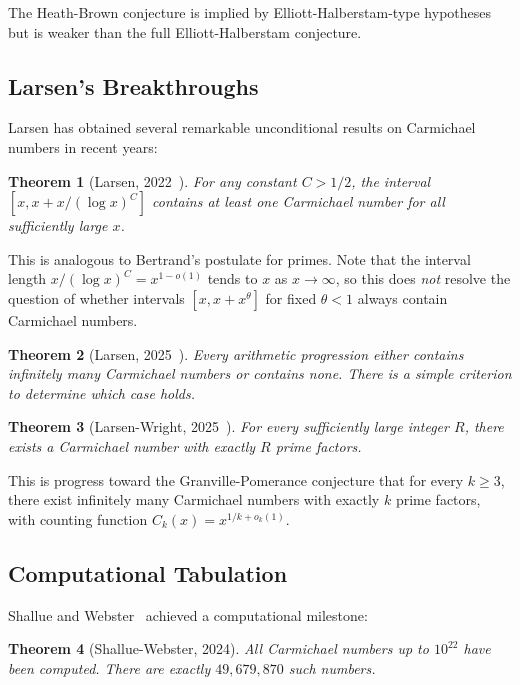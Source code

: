 \documentclass{amsart}
\theoremstyle{plain}
\newtheorem{theorem}{Theorem}[section]
\theoremstyle{definition}
\theoremstyle{remark}
\begin{document}
The Heath-Brown conjecture is implied by Elliott-Halberstam-type hypotheses but is weaker than the full Elliott-Halberstam conjecture.

\subsection{Larsen's Breakthroughs}

Larsen has obtained several remarkable unconditional results on Carmichael numbers in recent years:

\begin{theorem}[Larsen, 2022~\cite{larsen2023}]
\label{thm:larsen-short}
For any constant $C > 1/2$, the interval $[x, x + x/(\log x)^C]$ contains at least one Carmichael number for all sufficiently large $x$.
\end{theorem}

This is analogous to Bertrand's postulate for primes. Note that the interval length $x/(\log x)^C = x^{1 - o(1)}$ tends to $x$ as $x \to \infty$, so this does \emph{not} resolve the question of whether intervals $[x, x + x^\theta]$ for fixed $\theta < 1$ always contain Carmichael numbers.

\begin{theorem}[Larsen, 2025~\cite{larsen2025ap}]
\label{thm:larsen-ap}
Every arithmetic progression either contains infinitely many Carmichael numbers or contains none. There is a simple criterion to determine which case holds.
\end{theorem}

\begin{theorem}[Larsen-Wright, 2025~\cite{larsenwright2025}]
\label{thm:larsen-wright}
For every sufficiently large integer $R$, there exists a Carmichael number with exactly $R$ prime factors.
\end{theorem}

This is progress toward the Granville-Pomerance conjecture that for every $k \ge 3$, there exist infinitely many Carmichael numbers with exactly $k$ prime factors, with counting function $C_k(x) = x^{1/k + o_k(1)}$.

\subsection{Computational Tabulation}

Shallue and Webster~\cite{shalluewebster2024} achieved a computational milestone:

\begin{theorem}[Shallue-Webster, 2024]
\label{thm:shallue-webster}
All Carmichael numbers up to $10^{22}$ have been computed. There are exactly $49{,}679{,}870$ such numbers.
\end{theorem}
\end{document}
